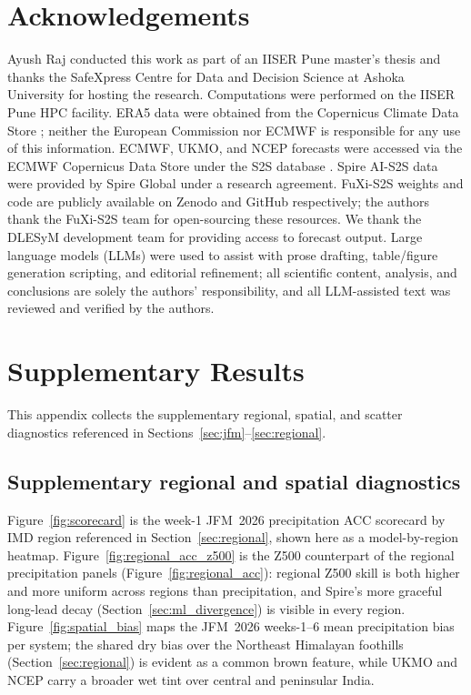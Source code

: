 \documentclass[11pt,a4paper]{article}
\begin{document}
\section*{Acknowledgements}

Ayush Raj conducted this work as part of an IISER Pune master's thesis
and thanks the SafeXpress Centre for Data and Decision Science at Ashoka
University for hosting the research. Computations were performed on the
IISER Pune HPC facility. ERA5 data were obtained from the Copernicus Climate
Data Store \citep{hersbach2020}; neither the European Commission nor ECMWF is
responsible for any use of this information. ECMWF, UKMO, and NCEP forecasts
were accessed via the ECMWF Copernicus Data Store under the S2S database
\citep{vitart2017}. Spire AI-S2S data were provided by Spire Global under a
research agreement. FuXi-S2S weights and code are publicly available on Zenodo
and GitHub respectively; the authors thank the FuXi-S2S team for open-sourcing
these resources. We thank the DLESyM development team for providing access to
forecast output. Large language models (LLMs) were used to assist with prose
drafting, table/figure generation scripting, and editorial refinement; all
scientific content, analysis, and conclusions are solely the authors'
responsibility, and all LLM-assisted text was reviewed and verified by the
authors.

\appendix
\section{Supplementary Results}\label{app:supp}

This appendix collects the supplementary regional, spatial, and scatter
diagnostics referenced in Sections~\ref{sec:jfm}--\ref{sec:regional}.

\subsection{Supplementary regional and spatial diagnostics}\label{app:spatial}

Figure~\ref{fig:scorecard} is the week-1 JFM~2026 precipitation ACC scorecard
by IMD region referenced in Section~\ref{sec:regional}, shown here as a
model-by-region heatmap. Figure~\ref{fig:regional_acc_z500} is the Z500
counterpart of the regional precipitation panels
(Figure~\ref{fig:regional_acc}): regional Z500 skill is both higher and more
uniform across regions than precipitation, and Spire's more graceful long-lead
decay (Section~\ref{sec:ml_divergence}) is visible in every region.
Figure~\ref{fig:spatial_bias} maps the JFM~2026 weeks-1--6 mean precipitation
bias per system; the shared dry bias over the Northeast Himalayan foothills
(Section~\ref{sec:regional}) is evident as a common brown feature, while UKMO
and NCEP carry a broader wet tint over central and peninsular India.
\end{document}
